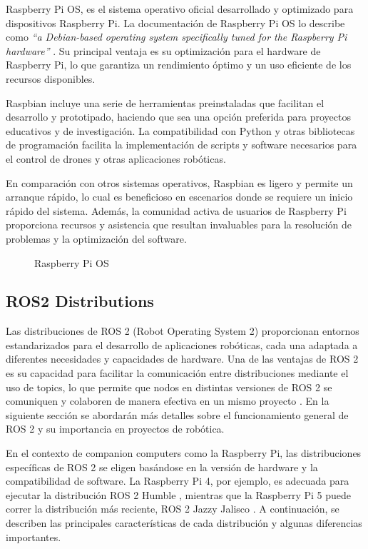     Raspberry Pi OS, es el sistema operativo oficial desarrollado y optimizado para dispositivos Raspberry Pi. La documentación de Raspberry Pi OS lo describe como \textit{“a Debian-based operating system specifically tuned for the Raspberry Pi hardware”} \cite{raspbian_docs}. Su principal ventaja es su optimización para el hardware de Raspberry Pi, lo que garantiza un rendimiento óptimo y un uso eficiente de los recursos disponibles.

    Raspbian incluye una serie de herramientas preinstaladas que facilitan el desarrollo y prototipado, haciendo que sea una opción preferida para proyectos educativos y de investigación. La compatibilidad con Python y otras bibliotecas de programación facilita la implementación de scripts y software necesarios para el control de drones y otras aplicaciones robóticas.

    En comparación con otros sistemas operativos, Raspbian es ligero y permite un arranque rápido, lo cual es beneficioso en escenarios donde se requiere un inicio rápido del sistema. Además, la comunidad activa de usuarios de Raspberry Pi proporciona recursos y asistencia que resultan invaluables para la resolución de problemas y la optimización del software.

    \begin{figure}[h!] 
    \centering 
    \caption{Raspberry Pi OS}
    \label{fig}
    \end{figure}

\subsection{ROS2 Distributions}
    Las distribuciones de ROS 2 (Robot Operating System 2) proporcionan entornos estandarizados para el desarrollo de aplicaciones robóticas, cada una adaptada a diferentes necesidades y capacidades de hardware. Una de las ventajas de ROS 2 es su capacidad para facilitar la comunicación entre distribuciones mediante el uso de topics, lo que permite que nodos en distintas versiones de ROS 2 se comuniquen y colaboren de manera efectiva en un mismo proyecto \cite{ros_docs}. En la siguiente sección se abordarán más detalles sobre el funcionamiento general de ROS 2 y su importancia en proyectos de robótica.

    En el contexto de companion computers como la Raspberry Pi, las distribuciones específicas de ROS 2 se eligen basándose en la versión de hardware y la compatibilidad de software. La Raspberry Pi 4, por ejemplo, es adecuada para ejecutar la distribución ROS 2 Humble \cite{raspberry_docs}, mientras que la Raspberry Pi 5 puede correr la distribución más reciente, ROS 2 Jazzy Jalisco \cite{ros_docs}. A continuación, se describen las principales características de cada distribución y algunas diferencias importantes.

